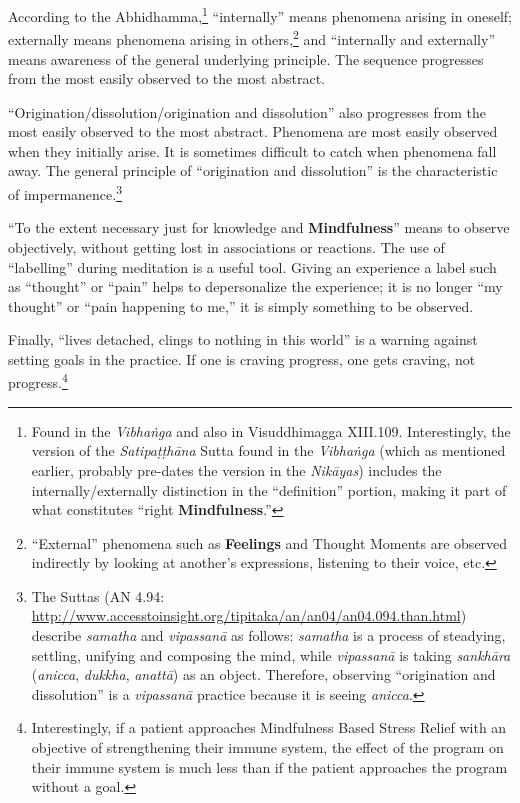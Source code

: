 According to the Abhidhamma,\footnote{Found in the \textit{Vibhaṅga} and also in Visuddhimagga XIII.109. Interestingly, the version of the \textit{Satipaṭṭhāna} Sutta found in the \textit{Vibhaṅga} (which as mentioned earlier, probably pre-dates the version in the \textit{Nikāyas}) includes the internally/externally distinction in the “definition” portion, making it part of what constitutes “right \textbf{Mindfulness}.”} “internally” means phenomena arising in oneself; externally means phenomena arising in others,\footnote{“External” phenomena such as \textbf{Feelings} and Thought Moments are observed indirectly by looking at another’s expressions, listening to their voice, etc.} and “internally and externally” means awareness of the general underlying principle. The sequence progresses from the most easily observed to the most abstract.

“Origination/dissolution/origination and dissolution” also progresses from the most easily observed to the most abstract. Phenomena are most easily observed when they initially arise. It is sometimes difficult to catch when phenomena fall away. The general principle of “origination and dissolution” is the characteristic of impermanence.\footnote{The Suttas (AN 4.94: \url{http://www.accesstoinsight.org/tipitaka/an/an04/an04.094.than.html}) describe \textit{samatha} and \textit{vipassanā} as follows: \textit{samatha} is a process of steadying, settling, unifying and composing the mind, while \textit{vipassanā} is taking \textit{sankhāra} (\textit{anicca}, \textit{dukkha}, \textit{anattā}) as an object. Therefore, observing “origination and dissolution” is a \textit{vipassanā} practice because it is seeing \textit{anicca}.}

“To the extent necessary just for knowledge and \textbf{Mindfulness}” means to observe objectively, without getting lost in associations or reactions. The use of “labelling” during meditation is a useful tool. Giving an experience a label such as “thought” or “pain” helps to depersonalize the experience; it is no longer “my thought” or “pain happening to me,” it is simply something to be observed.

Finally, “lives detached, clings to nothing in this world” is a warning against setting goals in the practice. If one is craving progress, one gets craving, not progress.\footnote{Interestingly, if a patient approaches Mindfulness Based Stress Relief with an objective of strengthening their immune system, the effect of the program on their immune system is much less than if the patient approaches the program without a goal.}

